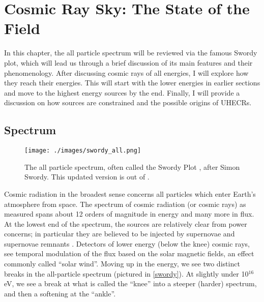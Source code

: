
\chapter{Cosmic Ray Sky: The State of the Field}
In this chapter, the all particle spectrum will be reviewed via the famous Swordy plot, which will lead us through a brief discussion of its main features and their phenomenology. After discussing cosmic rays of all energies, I will explore how they reach their energies. This will start with the lower energies in earlier sections and move to the highest energy sources by the end. Finally, I will provide a discussion on how sources are constrained and the possible origins of UHECRs.
\section{Spectrum}

\begin{figure}
\begin{center}
\texttt{[image: ./images/swordy\_all.png]}
\begin{singlespace}
\caption[All Particle Spectrum (Swordy Plot)]{The all particle spectrum, often called the Swordy Plot \cite{realsswordy}, after Simon Swordy. This updated version is out of \textcite{swordyplot}.}
\end{singlespace}
\label{swordy}
\end{center}
\end{figure}


Cosmic radiation in the broadest sense concerns all particles which enter Earth's atmosphere from space. The spectrum of cosmic radiation (or cosmic rays)  as measured spans about 12 orders of magnitude in energy and many more in flux. At the lowest end of the spectrum, the sources are relatively clear from power concerns; in particular they are believed to be injected by supernovae and supernovae remnants \cite{stanev}. Detectors of lower energy (below the knee) cosmic rays, see temporal modulation of the flux based on the solar magnetic fields, an effect commonly called ``solar wind''. Moving up in the energy, we see two distinct breaks in the all-particle spectrum (pictured in \autoref{swordy}). At slightly under 10$^{16}$eV, we see a break at what is called the ``knee'' into a steeper (harder) spectrum, and then a softening at the ``ankle''. 

